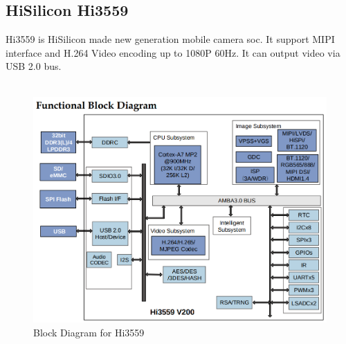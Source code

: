\documentclass[12pt,article]{memoir}
\begin{document}
\subsection{HiSilicon Hi3559}
Hi3559 is HiSilicon made new generation mobile camera soc. It support MIPI interface and H.264 Video encoding up to 1080P 60Hz. It can output video via USB 2.0 bus.\\\\
\begin{figure}[htp]
\begin{center}
\includegraphics[width=\textwidth]{DR00002_Hi3559.png}
 \caption{Block Diagram for Hi3559}	
\end{center}
\end{figure}
\newpage
\end{document}
